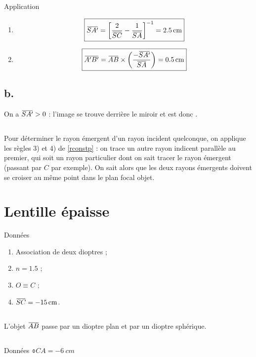 \documentclass[10pt,a5paper,notitlepage]{book}
\begin{document}
\begin{NCexem}{Application}
    \begin{enumerate}
        \item \[ \boxed{\SAp = \left[ \frac{2}{\SC}- \frac{1}{\SA}\right]^{-1} =
            \SI{+2.5}{cm}}\]
        \item \[ \boxed{\ABp = \ABb\times \LR{-\SAp}{\SA} = \SI{0.5}{cm}} \]
    \end{enumerate}
\end{NCexem}

\setcounter{subsection}{1}
\subsection{b.}
On a $\SAp > 0$ : l'image se trouve derrière le miroir et est donc
.

\subsection{}
Pour déterminer le rayon émergent d'un rayon incident quelconque, on applique
les règles 3) et 4) de \ref{rconstp} : on trace un autre rayon indicent
parallèle au premier, qui soit un rayon particulier dont on sait tracer le rayon
émergent (passant par $C$ par exemple). On sait alors que les deux rayons
émergents doivent se croiser au même point dans le plan focal objet.

\section{Lentille épaisse}
\begin{NCdefi}{Données}
    \begin{enumerate}
        \item Association de deux dioptres ;
        \item $n = 1.5$ ;
        \item $O \equiv C$ ;
        \item $\SC = \SI{-15}{cm}$.
    \end{enumerate}
\end{NCdefi}

\subsection{}
L'objet $\ABb$ passe par un dioptre plan et par un dioptre sphérique.

\subsection{}
\begin{NCdefi}{Données}
    $\obar{CA} = \SI{-6}{cm}$
\end{NCdefi}
\end{document}
